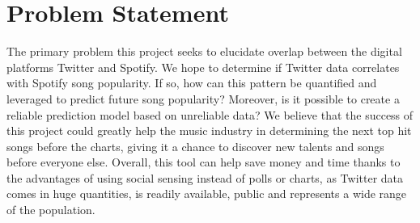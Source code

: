 \documentclass[12pt,conference]{IEEEtran}
\begin{document}
\section{Problem Statement}
The primary problem this project seeks to elucidate overlap between the digital platforms Twitter and Spotify. We hope to determine if Twitter data correlates with Spotify song popularity. If so, how can this pattern be quantified and leveraged to predict future song popularity? Moreover, is it possible to create a reliable prediction model based on unreliable data? We believe that the success of this project could greatly help the music industry in determining the next top hit songs before the charts, giving it a chance to discover new talents and songs before everyone else. Overall, this tool can help save money and time thanks to the advantages of using social sensing instead of polls or charts, as Twitter data comes in huge quantities, is readily available, public and represents a wide range of the population. \par
\end{document}

